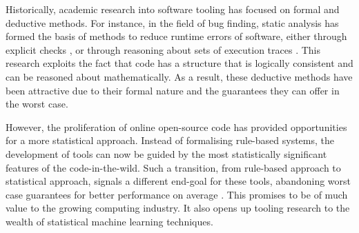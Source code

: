 



Historically, academic research into software tooling has focused on formal and deductive methods. 
For instance, in the field of bug finding, static analysis has formed the basis of methods to reduce runtime errors of software, either through explicit checks \citep{okada_combination_2007}, or through reasoning about sets of execution traces
\citep{bessey_few_2010}. 
This research exploits the fact that code has a structure that is logically consistent and can be reasoned about mathematically.
As a result, these deductive methods have been attractive due to their formal nature and the guarantees they can offer in the worst case.


However, the proliferation of online open-source code \citep{dyer_boa_2013} has provided opportunities for a more statistical approach. 
Instead of formalising rule-based systems, the development of tools can now be guided by the most statistically significant features of the code-in-the-wild.
Such a transition, from rule-based approach to statistical approach, signals a different end-goal for these tools, abandoning worst case guarantees for better performance on average \citep{allamanis_survey_2017}. %
This promises to be of much value to the growing computing industry. It also opens up tooling research to the wealth of statistical machine learning techniques.
 
